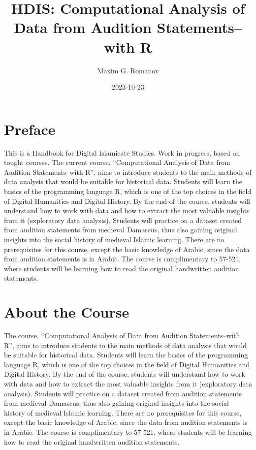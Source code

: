 \documentclass[
]{book}
\title{HDIS: Computational Analysis of Data from Audition Statements--with R}
\author{Maxim G. Romanov}
\date{2023-10-23}
\begin{document}
\maketitle

{
\setcounter{tocdepth}{1}
\tableofcontents
}
\hypertarget{preface}{%
\chapter*{Preface}\label{preface}}

This is a Handbook for Digital Islamicate Studies. Work in progress, based on tought courses. The current course, ``Computational Analysis of Data from Audition Statements--with R'', aims to introduce students to the main methods of data analysis that would be suitable for historical data. Students will learn the basics of the programming language R, which is one of the top choices in the field of Digital Humanities and Digital History. By the end of the course, students will understand how to work with data and how to extract the most valuable insights from it (exploratory data analysis). Students will practice on a dataset created from audition statements from medieval Damascus, thus also gaining original insights into the social history of medieval Islamic learning. There are no prerequisites for this course, except the basic knowledge of Arabic, since the data from audition statements is in Arabic. The course is complimentary to 57-521, where students will be learning how to read the original handwritten audition statements.

\hypertarget{about-the-course}{%
\chapter*{About the Course}\label{about-the-course}}

The course, ``Computational Analysis of Data from Audition Statements--with R'', aims to introduce students to the main methods of data analysis that would be suitable for historical data. Students will learn the basics of the programming language R, which is one of the top choices in the field of Digital Humanities and Digital History. By the end of the course, students will understand how to work with data and how to extract the most valuable insights from it (exploratory data analysis). Students will practice on a dataset created from audition statements from medieval Damascus, thus also gaining original insights into the social history of medieval Islamic learning. There are no prerequisites for this course, except the basic knowledge of Arabic, since the data from audition statements is in Arabic. The course is complimentary to 57-521, where students will be learning how to read the original handwritten audition statements.
\end{document}
